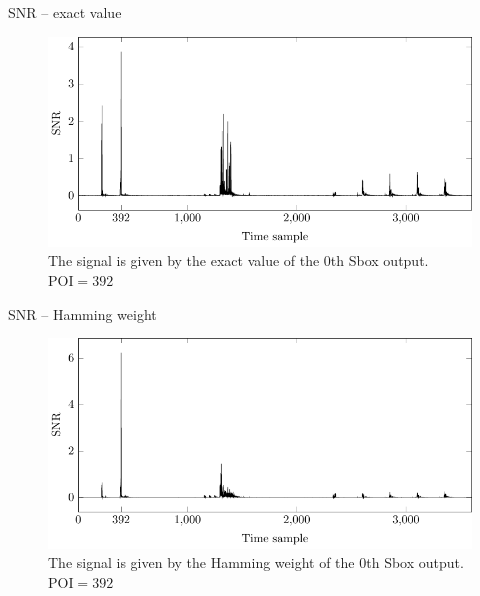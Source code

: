 \begin{frame}{SNR -- exact value}
     \begin{figure} 
        \centering
        \includegraphics{fig/SNR_identity_model.pdf}
        \caption{
        The signal is given by the exact value of the $0$th Sbox output.
        $\text{POI}=392$}
    \end{figure}
\end{frame}

\begin{frame}{SNR -- Hamming weight}
    \begin{figure} 
        \centering
        \includegraphics{fig/SNR_hw.pdf}
        \caption{
        The signal is given by the Hamming weight of the $0$th Sbox output.
        $\text{POI}=392$}
    \end{figure}
\end{frame}

